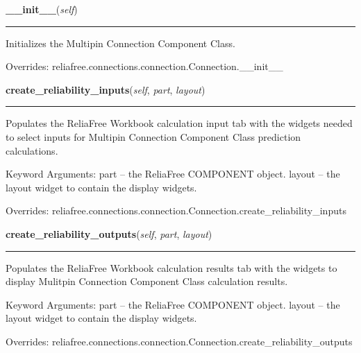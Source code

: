     \vspace{0.5ex}

\hspace{.8\funcindent}\begin{boxedminipage}{\funcwidth}

    \raggedright \textbf{\_\_init\_\_}(\textit{self})

    \vspace{-1.5ex}

    \rule{\textwidth}{0.5\fboxrule}
\setlength{\parskip}{2ex}
    Initializes the Multipin Connection Component Class.

\setlength{\parskip}{1ex}
      Overrides: reliafree.connections.connection.Connection.\_\_init\_\_

    \end{boxedminipage}

    \vspace{0.5ex}

\hspace{.8\funcindent}\begin{boxedminipage}{\funcwidth}

    \raggedright \textbf{create\_reliability\_inputs}(\textit{self}, \textit{part}, \textit{layout})

    \vspace{-1.5ex}

    \rule{\textwidth}{0.5\fboxrule}
\setlength{\parskip}{2ex}
    Populates the ReliaFree Workbook calculation input tab with the widgets
    needed to select inputs for Multipin Connection Component Class 
    prediction calculations.

    Keyword Arguments: part   -- the ReliaFree COMPONENT object. layout -- 
    the layout widget to contain the display widgets.

\setlength{\parskip}{1ex}
      Overrides: reliafree.connections.connection.Connection.create\_reliability\_inputs

    \end{boxedminipage}

    \vspace{0.5ex}

\hspace{.8\funcindent}\begin{boxedminipage}{\funcwidth}

    \raggedright \textbf{create\_reliability\_outputs}(\textit{self}, \textit{part}, \textit{layout})

    \vspace{-1.5ex}

    \rule{\textwidth}{0.5\fboxrule}
\setlength{\parskip}{2ex}
    Populates the ReliaFree Workbook calculation results tab with the 
    widgets to display Mulitpin Connection Component Class calculation 
    results.

    Keyword Arguments: part   -- the ReliaFree COMPONENT object. layout -- 
    the layout widget to contain the display widgets.

\setlength{\parskip}{1ex}
      Overrides: reliafree.connections.connection.Connection.create\_reliability\_outputs

    \end{boxedminipage}

